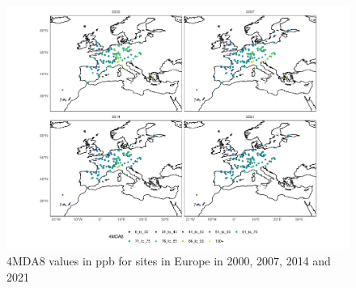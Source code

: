 \documentclass[journal abbreviation, manuscript]{copernicus}
\begin{document}
\begin{figure}[h]
\includegraphics[width=12cm]{figures/f12_4mda8_eu.pdf}
\caption{4MDA8 values in ppb for sites in Europe in 2000, 2007, 2014 and 2021}
\label{fig:eu_4mda8_map}
\end{figure}
\end{document}
